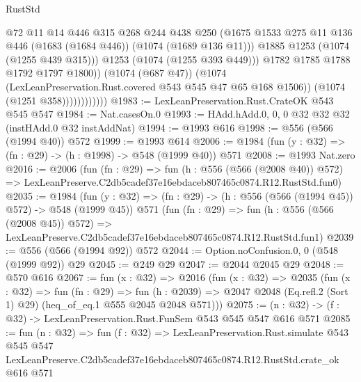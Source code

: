 \begin{lexlean}{RustStd}
\begin{coremodule}
                                @72
                                @11
                                @14
                                @446
                                @315
                                @268
                                @244
                                @438
                                @250
                                (@1675
                                  @1533
                                  @275
                                  @11
                                  @136
                                  @446
                                  (@1683 (@1684 @446))
                                  (@1074 (@1689 @136 @11)))
                                @1885
                                @1253
                                (@1074 (@1255 @439 @315)))
                              @1253
                              (@1074 (@1255 @393 @449)))
                            @1782
                            @1785
                            @1788
                            @1792
                            @1797
                            @1800))
                        (@1074 (@687 @47))
                        (@1074 (LexLeanPreservation.Rust.covered @543 @545 @47 @65 @168 @1506))
                        (@1074 (@1251 @358))))))))))))
@1983 := LexLeanPreservation.Rust.CrateOK @543 @545 @547
@1984 := Nat.casesOn.{0}
@1993 := HAdd.hAdd.{0, 0, 0} @32 @32 @32 (instHAdd.{0} @32 instAddNat)
@1994 := @1993 @616
@1998 := @556 (@566 (@1994 @40)) @572
@1999 := @1993 @614
@2006 := @1984 (fun (y : @32) => (fn : @29) -> (h : @1998) -> @548 (@1999 @40)) @571
@2008 := @1993 Nat.zero
@2016 := @2006
    (fun (fn : @29) =>
    fun (h : @556 (@566 (@2008 @40)) @572) =>
    LexLeanPreserve.C2db5cadef37e16ebdaceb807465c0874.R12.RustStd.fun0)
@2035 := @1984
    (fun (y : @32) => (fn : @29) -> (h : @556 (@566 (@1994 @45)) @572) -> @548 (@1999 @45))
    @571
    (fun (fn : @29) =>
    fun (h : @556 (@566 (@2008 @45)) @572) =>
    LexLeanPreserve.C2db5cadef37e16ebdaceb807465c0874.R12.RustStd.fun1)
@2039 := @556 (@566 (@1994 @92)) @572
@2044 := Option.noConfusion.{0, 0} (@548 (@1999 @92)) @29
@2045 := @249 @29
@2047 := @2044 @2045 @29
@2048 := @570 @616
@2067 := fun (x : @32) =>
  @2016
    (fun (x : @32) =>
    @2035
      (fun (x : @32) =>
      fun (fn : @29) =>
      fun (h : @2039) =>
      @2047 @2048 (Eq.refl.{2} (Sort 1) @29) (heq_of_eq.{1} @555 @2045 @2048 @571)))
@2075 := (n : @32) -> (f : @32) -> LexLeanPreservation.Rust.FunSem @543 @545 @547 @616 @571
@2085 := fun (n : @32) =>
  fun (f : @32) =>
  LexLeanPreservation.Rust.simulate
    @543
    @545
    @547
    LexLeanPreserve.C2db5cadef37e16ebdaceb807465c0874.R12.RustStd.crate_ok
    @616
    @571
\end{coremodule}
\end{lexlean}
